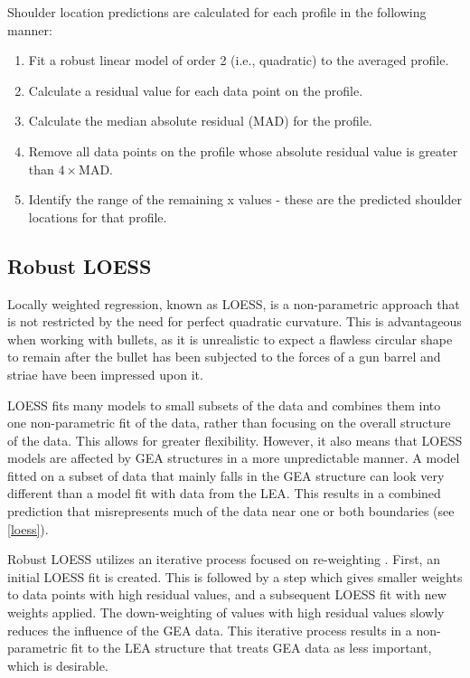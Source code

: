 \documentclass[]{article}
\begin{document}
{\color{orange}{what does it mean to be a large residual? Nail your point!}}

Shoulder location predictions are calculated for each profile in the
following manner:\\

\begin{enumerate}
\item Fit a robust linear model of order 2 (i.e., quadratic) to the averaged profile.   
\item Calculate a residual value for each data point on the profile.  
\item Calculate the median absolute residual (MAD) for the profile.  
\item Remove all data points on the profile whose absolute residual value is greater than $4 \times$MAD.  
\item Identify the range of the remaining x values - these are the predicted shoulder locations for that profile.   
\end{enumerate}

\subsection{Robust LOESS}

Locally weighted regression, known as LOESS, is a non-parametric
approach that is not restricted by the need for perfect quadratic
curvature. This is advantageous when working with bullets, as it is
unrealistic to expect a flawless circular shape to remain after the
bullet has been subjected to the forces of a gun barrel and striae have
been impressed upon it.

LOESS fits many models to small subsets of the data and combines them
into one non-parametric fit of the data, rather than focusing on the
overall structure of the data. This allows for greater flexibility.
However, it also means that LOESS models are affected by GEA structures
in a more unpredictable manner. A model fitted on a subset of data that
mainly falls in the GEA structure can look very different than a model
fit with data from the LEA. This results in a combined prediction that
misrepresents much of the data near one or both boundaries (see
\autoref{loess}).

Robust LOESS utilizes an iterative process focused on re-weighting
\citep[see][]{Cleveland1}. First, an initial LOESS fit is created. This
is followed by a step which gives smaller weights to data points with
high residual values, and a subsequent LOESS fit with new weights
applied. The down-weighting of values with high residual values slowly
reduces the influence of the GEA data. This iterative process results in
a non-parametric fit to the LEA structure that treats GEA data as less
important, which is desirable.
\end{document}
